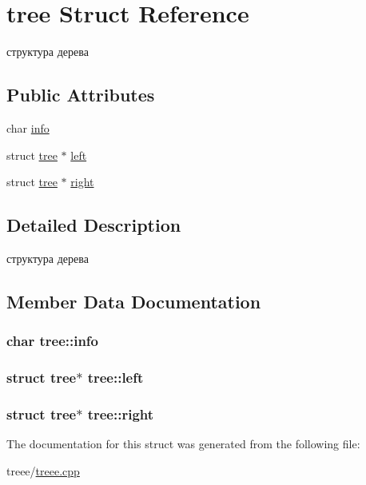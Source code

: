 \hypertarget{structtree}{\section{tree Struct Reference}
\label{structtree}
}


структура дерева  


\subsection*{Public Attributes}
\begin{DoxyCompactItemize}
\item 
char \hyperlink{structtree_aa2364e293fd7f793367711b97100556c}{info}
\item 
struct \hyperlink{structtree}{tree} $\ast$ \hyperlink{structtree_a719b6f34a3ac12d46c29f9b7d6308438}{left}
\item 
struct \hyperlink{structtree}{tree} $\ast$ \hyperlink{structtree_a50cf9e7e35dcd0cc2f207389d1ac8852}{right}
\end{DoxyCompactItemize}


\subsection{Detailed Description}
структура дерева 

\subsection{Member Data Documentation}
\hypertarget{structtree_aa2364e293fd7f793367711b97100556c}{
\subsubsection[{info}]{\setlength{\rightskip}{0pt plus 5cm}char tree\-::info}}\label{structtree_aa2364e293fd7f793367711b97100556c}
\hypertarget{structtree_a719b6f34a3ac12d46c29f9b7d6308438}{
\subsubsection[{left}]{\setlength{\rightskip}{0pt plus 5cm}struct {\bf tree}$\ast$ tree\-::left}}\label{structtree_a719b6f34a3ac12d46c29f9b7d6308438}
\hypertarget{structtree_a50cf9e7e35dcd0cc2f207389d1ac8852}{
\subsubsection[{right}]{\setlength{\rightskip}{0pt plus 5cm}struct {\bf tree}$\ast$ tree\-::right}}\label{structtree_a50cf9e7e35dcd0cc2f207389d1ac8852}


The documentation for this struct was generated from the following file\-:\begin{DoxyCompactItemize}
\item 
treee/\hyperlink{treee_8cpp}{treee.\-cpp}\end{DoxyCompactItemize}
